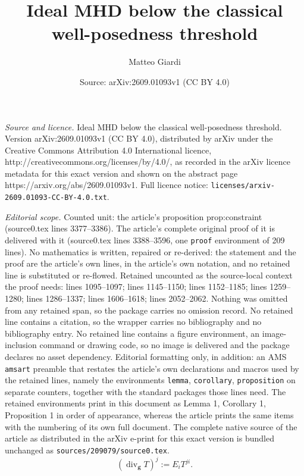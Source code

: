 \documentclass[10pt,a4paper]{amsart}
\title{Ideal MHD below the classical well-posedness threshold}
\author{Matteo Giardi}
\date{Source: arXiv:2609.01093v1 (CC BY 4.0)}
\DeclareMathOperator{\Div}{div}
\newcommand{\gmetric}{\mathbf g}
\begin{document}
\maketitle

\noindent\emph{Source and licence.} Ideal MHD below the classical well-posedness threshold. Version arXiv:2609.01093v1 (CC BY 4.0), distributed by arXiv under the Creative Commons Attribution 4.0 International licence, http://creativecommons.org/licenses/by/4.0/, as recorded in the arXiv licence metadata for this exact version and shown on the abstract page https://arxiv.org/abs/2609.01093v1. Full licence notice: \texttt{licenses/arxiv-2609.01093-CC-BY-4.0.txt}.\par\smallskip

\noindent\textit{Editorial scope.} Counted unit: the article's proposition prop:constraint (source0.tex lines 3377--3386). The article's complete original proof of it is delivered with it (source0.tex lines 3388--3596, one \texttt{proof} environment of 209 lines). No mathematics is written, repaired or re-derived: the statement and the proof are the article's own lines, in the article's own notation, and no retained line is substituted or re-flowed.  Retained uncounted as the source-local context the proof needs: lines 1095--1097; lines 1145--1150; lines 1152--1185; lines 1259--1280; lines 1286--1337; lines 1606--1618; lines 2052--2062.  Nothing was omitted from any retained span, so the package carries no omission record.  No retained line contains a citation, so the wrapper carries no bibliography and no bibliography entry.  No retained line contains a figure environment, an image-inclusion command or drawing code, so no image is delivered and the package declares no asset dependency.  Editorial formatting only, in addition: an AMS \texttt{amsart} preamble that restates the article's own declarations and macros used by the retained lines, namely the environments \texttt{lemma}, \texttt{corollary}, \texttt{proposition} on separate counters, together with the standard packages those lines need.  The retained environments print in this document as Lemma 1, Corollary 1, Proposition 1 in order of appearance, whereas the article prints the same items with the numbering of its own full document.  The complete native source of the article as distributed in the arXiv e-print for this exact version is bundled unchanged as \texttt{sources/209079/source0.tex}.
\begin{equation}\label{eq:metric-tensor-divergence}
 (\Div_{\gmetric}T)^j:=E_iT^{ji}.
\end{equation}
\end{document}
